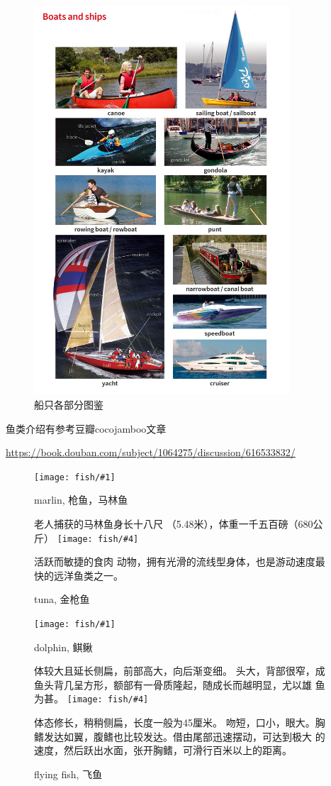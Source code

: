 \documentclass[fontset=ubuntu,zihao=-4]{ctexart}
\newcommand{\dingphotoh}[6] {
  \begin{figure}[htbp!]
    \centering
    \texttt{[image: fish/\#1]}
    \caption{#2}\label{fig:#1}
    \raggedright\small #3
    \vfill \vspace{1cm}
    \centering
    \texttt{[image: fish/\#4]}
    \caption{#5}\label{fig:#4}
    \raggedright\small #6
  \end{figure}
  \clearpage
}
\begin{document}
\begin{figure}[ht!]
  \centering
  \includegraphics[width=0.85\textwidth]{fish/ship.jpg}
  \caption{\label{fig:ships}船只各部分图鉴}
\end{figure}
\clearpage

鱼类介绍有参考豆瓣cocojamboo文章

\url{https://book.douban.com/subject/1064275/discussion/616533832/}

\dingphotoh{marlin}{marlin, 枪鱼，马林鱼}{老人捕获的马林鱼身长十八尺
  （5.48米），体重一千五百磅（680公斤）}{tuna}{tuna, 金枪鱼}{活跃而敏捷的食肉
  动物，拥有光滑的流线型身体，也是游动速度最快的远洋鱼类之一。}

\dingphotoh{dolphin}{dolphin, 鲯鳅}{体较大且延长侧扁，前部高大，向后渐变细。
  头大，背部很窄，成鱼头背几呈方形，额部有一骨质隆起，随成长而越明显，尤以雄
  鱼为甚。}{flying}{flying fish, 飞鱼}{体态修长，稍稍侧扁，长度一般为45厘米。
  吻短，口小，眼大。胸鳍发达如翼，腹鳍也比较发达。借由尾部迅速摆动，可达到极大
  的速度，然后跃出水面，张开胸鳍，可滑行百米以上的距离。}
\end{document}
